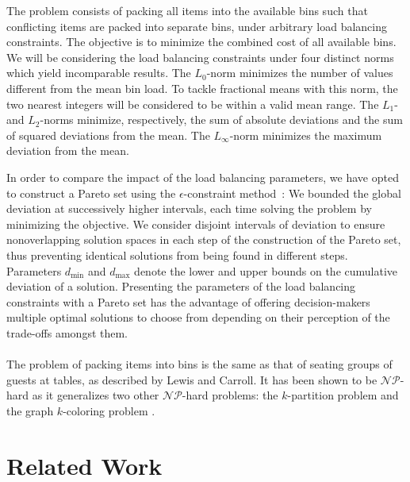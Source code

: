 \documentclass{llncs}
\begin{document}
The problem consists of packing all items into the available bins such that conflicting items are packed into separate bins, under arbitrary load balancing constraints. The objective is to minimize the combined cost of all available bins. We will be considering the load balancing constraints under four distinct norms which yield incomparable results. The $L_{0}$-norm minimizes the number of values different from the mean bin load. To tackle fractional means with this norm, the two nearest integers will be considered to be within a valid mean range. The $L_{1}$- and $L_{2}$-norms minimize, respectively, the sum of absolute deviations and the sum of squared deviations from the mean. The $L_{\infty}$-norm minimizes the maximum deviation from the mean.

In order to compare the impact of the load balancing parameters, we have opted to construct a Pareto set using the $\epsilon$-constraint method~\cite{Miettinen1998}: We bounded the global deviation at successively higher intervals, each time solving the problem by minimizing the objective. We consider disjoint intervals of deviation to ensure nonoverlapping solution spaces in each step of the construction of the Pareto set, thus preventing identical solutions from being found in different steps. Parameters $d_{\min}$ and $d_{\max}$ denote the lower and upper bounds on the cumulative deviation of a solution. Presenting the parameters of the load balancing constraints with a Pareto set has the advantage of offering decision-makers multiple optimal solutions to choose from depending on their perception of the trade-offs amongst them.

\paragraph{}The problem of packing items into bins is the same as that of seating groups of guests at tables, as described by Lewis and Carroll. It has been shown to be $\mathcal{NP}$-hard as it generalizes two other $\mathcal{NP}$-hard problems: the $k$-partition problem and the graph $k$-coloring problem \cite{Lewis2016}.




\section{Related Work}
\label{sec:related_work}
\end{document}
